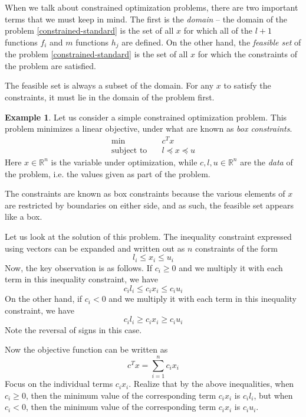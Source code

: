 \documentclass[a4paper]{article}
\theoremstyle{definition}
\newtheorem{example}{Example}[subsection]
\begin{document}
When we talk about constrained optimization problems, there are two important terms that we must keep in mind.
The first is the \textit{domain} -- the domain of the problem \eqref{constrained-standard} is the set of all $x$ for which all of the $l + 1$ functions $f_i$ and $m$ functions $h_j$ are defined.
On the other hand, the \textit{feasible set} of the problem \eqref{constrained-standard} is the set of all $x$ for which the constraints of the problem are satisfied.

The feasible set is always a subset of the domain.
For any $x$ to satisfy the constraints, it must lie in the domain of the problem first.

\begin{example}
	Let us consider a simple constrained optimization problem.
	This problem minimizes a linear objective, under what are known as \textit{box constraints}.
	\begin{align*}
		\min \quad & c^T x \\
		\text{subject to} \quad & l \preceq x \preceq u
	\end{align*}
	Here $x \in \mathbb{R}^n$ is the variable under optimization, while $c, l, u \in \mathbb{R}^n$ are the \textit{data} of the problem, i.e. the values given as part of the problem.

	The constraints are known as box constraints because the various elements of $x$ are restricted by boundaries on either side, and as such, the feasible set appears like a box.

	Let us look at the solution of this problem.
	The inequality constraint expressed using vectors can be expanded and written out as $n$ constraints of the form
	\begin{equation*}
		l_i \leq x_i \leq u_i
	\end{equation*}
	Now, the key observation is as follows.
	If $c_i \geq 0$ and we multiply it with each term in this inequality constraint, we have
	\begin{equation*}
		c_i l_i \leq c_i x_i \leq c_i u_i
	\end{equation*}
	On the other hand, if $c_i < 0$ and we multiply it with each term in this inequality constraint, we have
	\begin{equation*}
		c_i l_i \geq c_i x_i \geq c_i u_i
	\end{equation*}
	Note the reversal of signs in this case.

	Now the objective function can be written as
	\begin{equation*}
		c^T x = \sum_{i=1}^n c_i x_i
	\end{equation*}
	Focus on the individual terms $c_i x_i$.
	Realize that by the above inequalities, when $c_i \geq 0$, then the minimum value of the corresponding term $c_i x_i$ is $c_i l_i$, but when $c_i < 0$, then the minimum value of the corresponding term $c_i x_i$ is $c_i u_i$.


\end{example}
\end{document}
